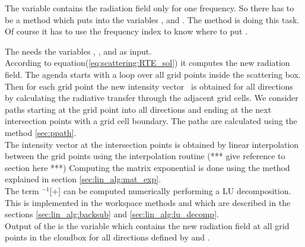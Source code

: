 The variable  contains the radiation field only
for one frequency. So there has to be a method which puts
 into the variables ,
 and . The method
 is doing this task.
Of course it has to use the frequency index to know where
to put .
 

\label{sec:scattering:scat_field_ag}

\label{sec:scattering:RT_ag}
The  needs the variables
, , 
and   as input.\\ 
According to equation(\ref{eq:scattering:RTE_sol}) it computes the new
radiation field. The agenda starts with a loop over all grid points
inside the scattering box. Then for each grid point the new intensity
vector
 \StoVec\  is obtained for all directions by calculating the
radiative transfer through the adjacent grid cells. We consider paths
starting at the grid point into all directions and ending at the next
intersection points with a grid cell boundary. The paths are calculated
using the method \ref{sec:ppath}.\\
 The intensity vector at
the intersection points  is obtained by linear interpolation
between the grid points using the interpolation routine (*** give 
reference to section here ***)
Computing the matrix exponential is done using the method
 explained in section
\ref{sec:lin_alg:mat_exp}.\\
 The term
\ExtMat$^{-1}$[\AbsVec\Planck+\ScaInt] can be computed numerically  
performing a LU decomposition. This is implemented in the workspace
methods  and  which are described
in the sections \ref{sec:lin_alg:backsub} and
\ref{sec:lin_alg:lu_decomp}. \\
Output of the  is the variable 
 which contains the new radiation field at all
grid points in the cloudbox for all directions defined by 
 and .

\label{sec:scattering:conv_method}





 


